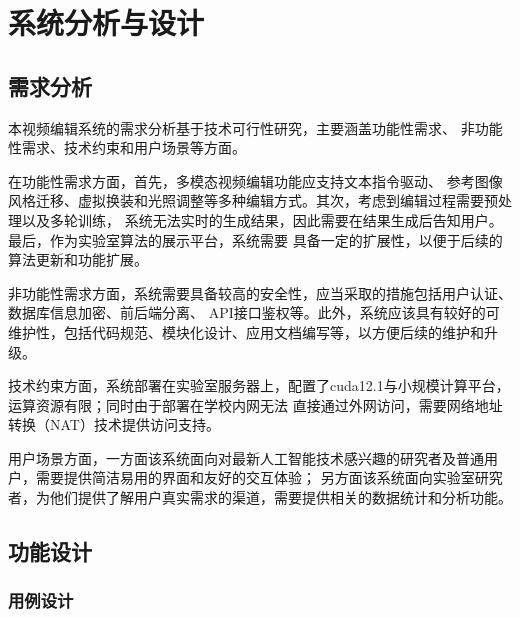 \chapter{系统分析与设计}

\section{需求分析}

本视频编辑系统的需求分析基于技术可行性研究，主要涵盖功能性需求、
非功能性需求、技术约束和用户场景等方面。

在功能性需求方面，首先，多模态视频编辑功能应支持文本指令驱动、
参考图像风格迁移、虚拟换装和光照调整等多种编辑方式。其次，考虑到编辑过程需要预处理以及多轮训练，
系统无法实时的生成结果，因此需要在结果生成后告知用户。最后，作为实验室算法的展示平台，系统需要
具备一定的扩展性，以便于后续的算法更新和功能扩展。

非功能性需求方面，系统需要具备较高的安全性，应当采取的措施包括用户认证、数据库信息加密、前后端分离、
API接口鉴权等。此外，系统应该具有较好的可维护性，包括代码规范、模块化设计、应用文档编写等，以方便后续的维护和升级。

技术约束方面，系统部署在实验室服务器上，配置了cuda12.1与小规模计算平台，运算资源有限；同时由于部署在学校内网无法
直接通过外网访问，需要网络地址转换（NAT）技术提供访问支持。

用户场景方面，一方面该系统面向对最新人工智能技术感兴趣的研究者及普通用户，需要提供简洁易用的界面和友好的交互体验；
另方面该系统面向实验室研究者，为他们提供了解用户真实需求的渠道，需要提供相关的数据统计和分析功能。

\section{功能设计}

\subsection{用例设计}

